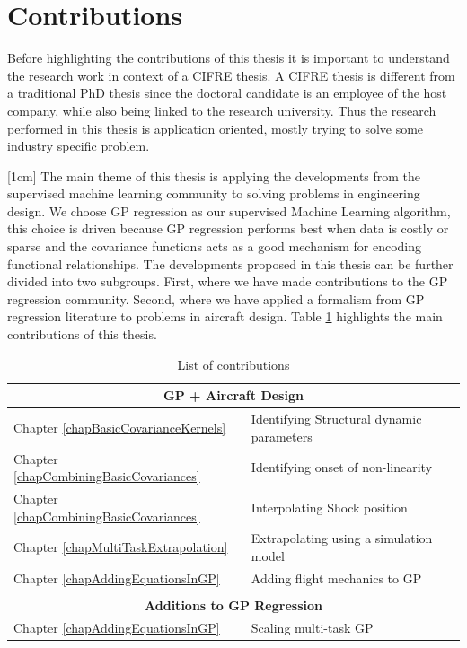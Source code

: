 \section{Contributions}\label{secCh1Contributions}
Before highlighting the contributions of this thesis it is important to understand the research work in context of a CIFRE thesis. A CIFRE thesis is different from a traditional PhD thesis since the doctoral candidate is an employee of the host company, while also being linked to the research university. Thus the research performed in this thesis is application oriented, mostly trying to solve some industry specific problem.

[1cm]
The main theme of this thesis is applying the developments from the supervised machine learning community to solving problems in engineering design. We choose GP regression as our supervised Machine Learning algorithm, this choice is driven because GP regression performs best when data is costly or sparse and the covariance functions acts as a good mechanism for encoding functional relationships. The developments proposed in this thesis can be further divided into two subgroups. First, where we have made contributions to the GP regression community. Second, where we have applied a formalism from GP regression literature to problems in aircraft design. Table \ref{tabListOfContributions} highlights the main contributions of this thesis.

\begin{table}[!ht]
\centering
\begin{tabularx}{\textwidth}{|X|l|}
  \hline
  \multicolumn{2}{c}{\textbf{GP + Aircraft Design}}\\
  \hline 
  \hline
Chapter \ref{chapBasicCovarianceKernels}& Identifying Structural dynamic parameters \cite{chiplunkar2017operational} \\
\hline
Chapter \ref{chapCombiningBasicCovariances} & Identifying onset of non-linearity \cite{chiplunkar:hal-01555401} \\
\hline
Chapter \ref{chapCombiningBasicCovariances} & Interpolating Shock position \cite{oatao18004} \\
\hline
Chapter \ref{chapMultiTaskExtrapolation} & Extrapolating using a simulation model \\
\hline
Chapter \ref{chapAddingEquationsInGP} & Adding flight mechanics to GP \cite{oatao18001} \\
\hline
\multicolumn{2}{c}{} \\
\hline
\hline
\multicolumn{2}{c}{\textbf{Additions to GP Regression}} \\
\hline
Chapter \ref{chapAddingEquationsInGP} & Scaling multi-task GP  \cite{icpram16Ankit, oatao18000}  \\
  \hline 
  \end{tabularx}
  \label{tabListOfContributions}
  \caption{List of contributions}
  \end{table}

